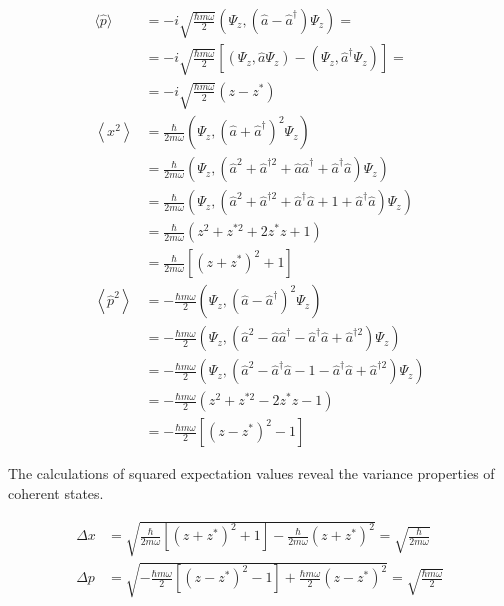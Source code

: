 \begin{align}
\langle\hat{p}\rangle & =-i \sqrt{\frac{\hbar m \omega}{2}}\left(\Psi_{z},\left(\hat{a}-\hat{a}^{\dagger}\right) \Psi_{z}\right)= \\
& =-i \sqrt{\frac{\hbar m \omega}{2}}\left[\left(\Psi_{z}, \hat{a} \Psi_{z}\right)-\left(\Psi_{z}, \hat{a}^{\dagger} \Psi_{z}\right)\right]=  \\
& =-i \sqrt{\frac{\hbar m \omega}{2}}\left(z-z^{*}\right) \\
\left\langle x^{2}\right\rangle & =\frac{\hbar}{2 m \omega}\left(\Psi_{z},\left(\hat{a}+\hat{a}^{\dagger}\right)^{2} \Psi_{z}\right) \\
& =\frac{\hbar}{2 m \omega}\left(\Psi_{z},\left(\hat{a}^{2}+\hat{a}^{\dagger 2}+\hat{a} \hat{a}^{\dagger}+\hat{a}^{\dagger} \hat{a}\right) \Psi_{z}\right) \\
& =\frac{\hbar}{2 m \omega}\left(\Psi_{z},\left(\hat{a}^{2}+\hat{a}^{\dagger 2}+\hat{a}^{\dagger} \hat{a}+1+\hat{a}^{\dagger} \hat{a}\right) \Psi_{z}\right)  \\
& =\frac{\hbar}{2 m \omega}\left(z^{2}+z^{* 2}+2 z^{*} z+1\right) \\
& =\frac{\hbar}{2 m \omega}\left[\left(z+z^{*}\right)^{2}+1\right] \\
\left\langle\hat{p}^{2}\right\rangle & =-\frac{\hbar m \omega}{2}\left(\Psi_{z},\left(\hat{a}-\hat{a}^{\dagger}\right)^{2} \Psi_{z}\right) \\
& =-\frac{\hbar m \omega}{2}\left(\Psi_{z},\left(\hat{a}^{2}-\hat{a} \hat{a}^{\dagger}-\hat{a}^{\dagger} \hat{a}+\hat{a}^{\dagger 2}\right) \Psi_{z}\right) \\
& =-\frac{\hbar m \omega}{2}\left(\Psi_{z},\left(\hat{a}^{2}-\hat{a}^{\dagger} \hat{a}-1-\hat{a}^{\dagger} \hat{a}+\hat{a}^{\dagger 2}\right) \Psi_{z}\right)  \\
& =-\frac{\hbar m \omega}{2}\left(z^{2}+z^{* 2}-2 z^{*} z-1\right) \\
& =-\frac{\hbar m \omega}{2}\left[\left(z-z^{*}\right)^{2}-1\right]
\end{align}

The calculations of squared expectation values reveal the variance properties of coherent states.

\begin{align}
\Delta x & =\sqrt{\frac{\hbar}{2 m \omega}\left[\left(z+z^{*}\right)^{2}+1\right]-\frac{\hbar}{2 m \omega}\left(z+z^{*}\right)^{2}}=\sqrt{\frac{\hbar}{2 m \omega}}  \\
\Delta p & =\sqrt{-\frac{\hbar m \omega}{2}\left[\left(z-z^{*}\right)^{2}-1\right]+\frac{\hbar m \omega}{2}\left(z-z^{*}\right)^{2}}=\sqrt{\frac{\hbar m \omega}{2}}
\end{align}

